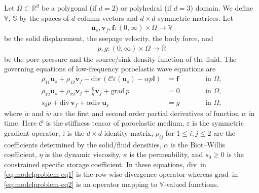 \documentclass[10pt,letterpaper]{amsart}
\theoremstyle{plain} %
\theoremstyle{remark} %
\newcommand{\vect}[1]{\mathbf{#1}}
\newcommand{\divergence}{\mathrm{div}\,}
\newcommand{\grad}{\mathrm{grad}\,}
\newcommand{\Id}{\mathbb{I}} %
\newcommand{\R}{\mathbb{R}} %
\newcommand{\Rn}{\mathbb{V}} %
\newcommand{\Cel}{\mathcal{C}} %
\begin{document}
Let $\Omega \subset \mathbb{R}^{d}$ be a polygonal (if $d=2$) or
polyhedral (if $d=3$) domain. We define $\mathbb{V}$, $\mathbb{S}$ by the spaces of $d$-column vectors and $d\times d$ symmetric matrices. Let 
%
\begin{align*}
	\vect{u}_{s}, \vect{v}_{f}, \vect{f}: (0,\infty) \times \Omega \to \Rn    
\end{align*}
%
be the solid displacement, the seepage velocity, the body force, and 
%
\begin{align*}
	p, g:(0, \infty) \times \Omega\to \R
\end{align*}
%
be the pore pressure and the source/sink density function of the fluid. The governing equations of low-frequency poroelastic wave equations are
%
\begin{subequations}
	\label{eq:modelproblem}
	\begin{alignat}{4}
		\label{eq:modelproblem-eq1}
		\rho_{11} \ddot{\vect{u}}_{s} + \rho_{12} \dot{\vect{v}}_{f} - \divergence (\Cel \varepsilon(\vect{u}_{s}) - \alpha p \Id ) & = \vect{f} &&\qquad \text{in }\Omega,\\
		\label{eq:modelproblem-eq2}
		\rho_{12} \ddot{\vect{u}}_{s} + \rho_{22} \dot{\vect{v}}_{f} + \frac{\eta}{\kappa} \vect{v}_{f} + \grad p & = 0&&\qquad \text{in }\Omega,\\
		\label{eq:modelproblem-eq3}
		s_{0} \dot{p} + \divergence \vect{v}_{f} + \alpha \divergence \dot{\vect{u}}_{s} & = g&&\qquad \text{in }\Omega,
	\end{alignat}
\end{subequations}
%
where $\dot{w}$ and $\ddot{w}$ are the first and second order partial derivatives of function $w$ in time. Here $\Cel$ is the stiffness tensor of poroelastic medium, $\varepsilon$ is the symmetric gradient operator, $\mathbb{I}$ is the $d\times d$ identity matrix, $\rho_{ij}$ for $1\le i, j \le 2$ are the coefficients determined by the solid/fluid densities, $\alpha$ is the Biot--Willis coefficient, $\eta$ is the dynamic viscosity, $\kappa$ is the permeability, and $s_0 \ge 0$ is the constrained specific storage coefficient. In these equations, $\divergence$ in \eqref{eq:modelproblem-eq1} is the row-wise divergence operator whereas $\grad$ in \eqref{eq:modelproblem-eq2} is an operator mapping to $\mathbb{V}$-valued functions.
\end{document}

